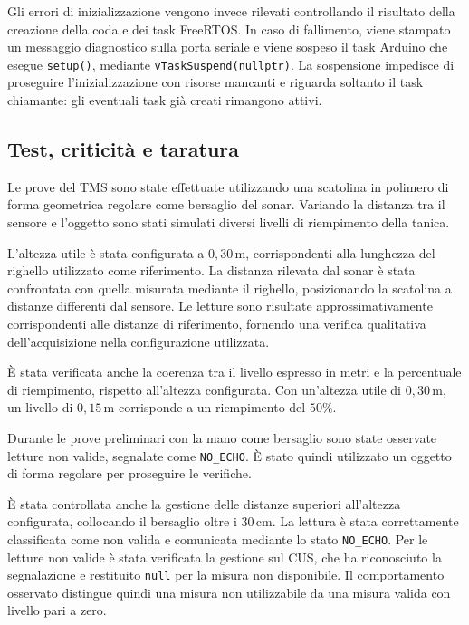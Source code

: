 Gli errori di inizializzazione vengono invece rilevati
controllando il risultato della creazione della coda
e dei task FreeRTOS.
In caso di fallimento, viene stampato un messaggio diagnostico
sulla porta seriale e viene sospeso il task Arduino
che esegue \texttt{setup()}, mediante
\texttt{vTaskSuspend(nullptr)}.
La sospensione impedisce di proseguire l'inizializzazione
con risorse mancanti e riguarda soltanto il task chiamante:
gli eventuali task già creati rimangono attivi.


\subsection{Test, criticità e taratura}
\label{subsec:tms-tests}

Le prove del TMS sono state effettuate utilizzando una
scatolina in polimero di forma geometrica regolare come
bersaglio del sonar.
Variando la distanza tra il sensore e l'oggetto sono stati
simulati diversi livelli di riempimento della tanica.

L'altezza utile è stata configurata a
\(0{,}30\,\mathrm{m}\), corrispondenti alla lunghezza
del righello utilizzato come riferimento.
La distanza rilevata dal sonar è stata confrontata
con quella misurata mediante il righello, posizionando
la scatolina a distanze differenti dal sensore.
Le letture sono risultate approssimativamente
corrispondenti alle distanze di riferimento,
fornendo una verifica qualitativa dell'acquisizione
nella configurazione utilizzata.

È stata verificata anche la coerenza tra il livello
espresso in metri e la percentuale di riempimento,
rispetto all'altezza configurata.
Con un'altezza utile di \(0{,}30\,\mathrm{m}\),
un livello di \(0{,}15\,\mathrm{m}\) corrisponde
a un riempimento del \(50\%\).

Durante le prove preliminari con la mano come bersaglio
sono state osservate letture non valide, segnalate come
\texttt{NO\_ECHO}.
È stato quindi utilizzato un oggetto di forma regolare
per proseguire le verifiche.

È stata controllata anche la gestione delle distanze
superiori all'altezza configurata, collocando il bersaglio
oltre i \(30\,\mathrm{cm}\).
La lettura è stata correttamente classificata come
non valida e comunicata mediante lo stato
\texttt{NO\_ECHO}.
Per le letture non valide è stata verificata la gestione
sul CUS, che ha riconosciuto la segnalazione e restituito
\texttt{null} per la misura non disponibile.
Il comportamento osservato distingue quindi una misura
non utilizzabile da una misura valida con livello
pari a zero.

